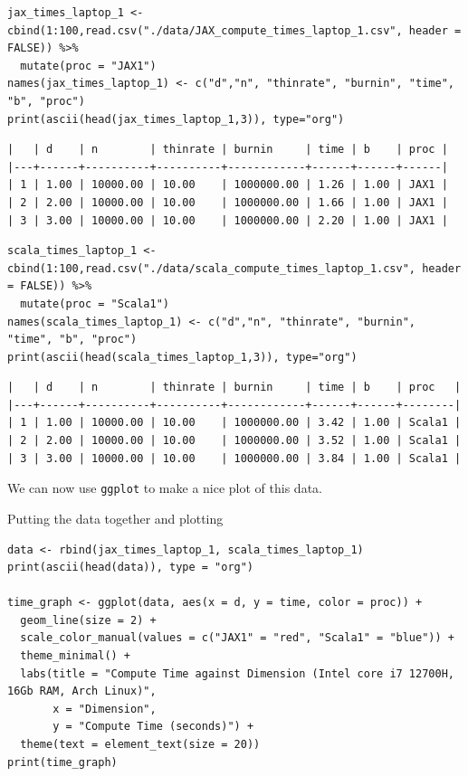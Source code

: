 \documentclass[letterpaper]{article}
\begin{document}
\begin{verbatim}
jax_times_laptop_1 <- cbind(1:100,read.csv("./data/JAX_compute_times_laptop_1.csv", header = FALSE)) %>%
  mutate(proc = "JAX1")
names(jax_times_laptop_1) <- c("d","n", "thinrate", "burnin", "time", "b", "proc")
print(ascii(head(jax_times_laptop_1,3)), type="org")
\end{verbatim}

\label{org697ca93}
\begin{verbatim}
|   | d    | n        | thinrate | burnin     | time | b    | proc |
|---+------+----------+----------+------------+------+------+------|
| 1 | 1.00 | 10000.00 | 10.00    | 1000000.00 | 1.26 | 1.00 | JAX1 |
| 2 | 2.00 | 10000.00 | 10.00    | 1000000.00 | 1.66 | 1.00 | JAX1 |
| 3 | 3.00 | 10000.00 | 10.00    | 1000000.00 | 2.20 | 1.00 | JAX1 |
\end{verbatim}


\begin{verbatim}
scala_times_laptop_1 <- cbind(1:100,read.csv("./data/scala_compute_times_laptop_1.csv", header = FALSE)) %>%
  mutate(proc = "Scala1")
names(scala_times_laptop_1) <- c("d","n", "thinrate", "burnin", "time", "b", "proc")
print(ascii(head(scala_times_laptop_1,3)), type="org")
\end{verbatim}

\label{org82d9d51}
\begin{verbatim}
|   | d    | n        | thinrate | burnin     | time | b    | proc   |
|---+------+----------+----------+------------+------+------+--------|
| 1 | 1.00 | 10000.00 | 10.00    | 1000000.00 | 3.42 | 1.00 | Scala1 |
| 2 | 2.00 | 10000.00 | 10.00    | 1000000.00 | 3.52 | 1.00 | Scala1 |
| 3 | 3.00 | 10000.00 | 10.00    | 1000000.00 | 3.84 | 1.00 | Scala1 |
\end{verbatim}


We can now use \texttt{ggplot} to make a nice plot of this data.

Putting the data together and plotting

\begin{verbatim}
data <- rbind(jax_times_laptop_1, scala_times_laptop_1)
print(ascii(head(data)), type = "org")

time_graph <- ggplot(data, aes(x = d, y = time, color = proc)) +
  geom_line(size = 2) +
  scale_color_manual(values = c("JAX1" = "red", "Scala1" = "blue")) +
  theme_minimal() + 
  labs(title = "Compute Time against Dimension (Intel core i7 12700H, 16Gb RAM, Arch Linux)",
       x = "Dimension",
       y = "Compute Time (seconds)") +
  theme(text = element_text(size = 20))
print(time_graph)
\end{verbatim}
\end{document}
